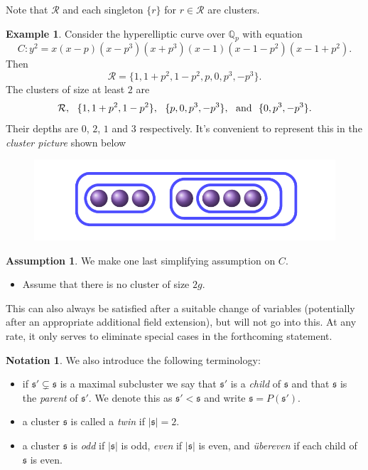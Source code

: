 \documentclass[12pt]{amsart}
\numberwithin{equation}{section}
\theoremstyle{remark}
\theoremstyle{definition}
\newtheorem{example}[equation]{Example}
\theoremstyle{definition}
\theoremstyle{definition}
\theoremstyle{definition}
\newtheorem{notation}[equation]{Notation}
\theoremstyle{definition}
\theoremstyle{definition}
\newtheorem{assumption}[equation]{Assumption}
\begin{document}
Note that $\mathcal{R}$ and each singleton $\{r\}$ for $r\in \mathcal{R}$ are clusters. 

\begin{example} \label{cluster example}
Consider the hyperelliptic curve over $\mathbb{Q}_p$ with equation
\[C:y^2=x(x-p)(x-p^3)(x+p^3)(x-1)(x-1-p^2)(x-1+p^2).\]
Then 
\[\mathcal{R}=\{1,1+p^2,1-p^2,p,0,p^3,-p^3\}.\]
The clusters of size at least $2$ are
\[\mathcal{R},~~\{1,1+p^2,1-p^2\},~~\{p,0,p^3,-p^3\},~~\textup{and}~~\{0,p^3,-p^3\}.\]
Their depths are $0$, $2$, $1$ and $3$ respectively. It's convenient to represent this in the \textit{cluster picture} shown below
\begin{figure} [!htb] 
\includegraphics[angle=0,scale=0.3]{cluster_picture}
\end{figure}
\end{example}

\begin{assumption} \label{assumption to simplify}
We make one last simplifying assumption on $C$. 
\begin{itemize}
\item Assume that there is no cluster of size $2g$.
\end{itemize}
This can also always be satisfied after a suitable change of variables (potentially after an appropriate additional field extension), but will not go into this. At any rate, it only serves to eliminate special cases in the forthcoming statement.
\end{assumption}

\begin{notation}
We also introduce the following terminology:
\begin{itemize}
\item if $\mathfrak{s}' \subsetneq \mathfrak{s}$ is a maximal subcluster we say that $\mathfrak{s}'$ is a \textit{child} of $\mathfrak{s}$ and that $\mathfrak{s}$ is the \textit{parent} of $\mathfrak{s}'$. We denote this as $\mathfrak{s}'<\mathfrak{s}$ and write $\mathfrak{s}=P(\mathfrak{s}')$. 
\item a cluster $\mathfrak{s}$ is called a \textit{twin} if $|\mathfrak{s}|=2$.
\item a cluster $\mathfrak{s}$ is \textit{odd} if $|\mathfrak{s}|$ is odd, \textit{even} if $|\mathfrak{s}|$ is even, and \textit{\"{u}bereven} if each child of $\mathfrak{s}$ is even.
\end{itemize}
\end{notation}
\end{document}
